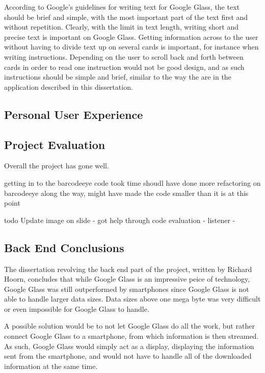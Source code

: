 According to Google's guidelines for writing text for Google Glass, the text should be brief and simple, with the most important part of the text first and without repetition. Clearly, with the limit in text length, writing short and precise text is important on Google Glass. Getting information across to the user without having to divide text up on several cards is important, for instance when writing instructions. Depending on the user to scroll back and forth between cards in order to read one instruction would not be good design, and as such instructions should be simple and brief, similar to the way the are in the application described in this dissertation.

\subsection{Personal User Experience}
\label{subsec:personalexperience}


\subsection{Project Evaluation}
Overall the project has gone well. 

getting in to the barcodeeye code took time shoudl have done more refactoring on barcodeeye along the way, might have made the code smaller than it is at this point



todo Update image on slide - got help through code evaluation - listener - 

\subsection{Back End Conclusions}
The dissertation revolving the back end part of the project, written by Richard Hoorn, concludes that while Google Glass is an impressive peice of technology, Google Glass was still outperformed by smartphones since Google Glass is not able to handle larger data sizes. Data sizes above one mega byte was very difficult or even impossible for Google Glass to handle.

A possible solution would be to not let Google Glass do all the work, but rather connect Google Glass to a smartphone, from which information is then streamed. As such, Google Glass would simply act as a display, displaying the information sent from the smartphone, and would not have to handle all of the downloaded information at the same time.

